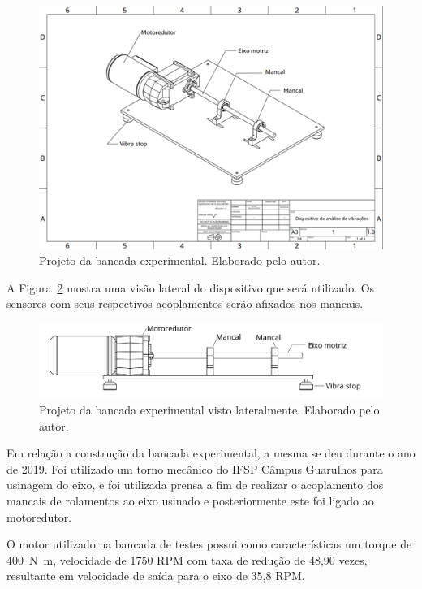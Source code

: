 \documentclass[
	12pt,				
	oneside,			
	a4paper,			
	english,			
	brazil,			
	]{abntex2ppgsi}
\begin{document}
\begin{figure}[H]
\centering
\includegraphics[width=\textwidth,height=\textheight,keepaspectratio]{Figura22}
\caption {Projeto da bancada experimental. Elaborado pelo autor.}
\label{Figura22}
\end{figure}

A Figura~\ref{dispositivo_teste_visto_de_lado} mostra uma visão lateral do dispositivo que será utilizado. Os sensores com seus respectivos acoplamentos serão afixados nos mancais. 

\begin{figure}[H]
\centering
\includegraphics[width=\textwidth,height=\textheight,keepaspectratio]{dispositivo_teste_visto_de_lado}
\caption {Projeto da bancada experimental visto lateralmente. Elaborado pelo autor.}
\label{dispositivo_teste_visto_de_lado}
\end{figure}


Em relação a construção da bancada experimental, a mesma se deu durante o ano de 2019. Foi utilizado um torno mecânico do IFSP Câmpus Guarulhos para usinagem do eixo, e foi utilizada prensa a fim de realizar o acoplamento dos mancais de rolamentos ao eixo usinado e posteriormente este foi ligado ao motoredutor. 

O motor utilizado na bancada de testes possui como características um torque de \SI{400}{\newton\metre}, velocidade de 1750 RPM com taxa de redução de 48,90 vezes, resultante em velocidade de saída para o eixo de 35,8 RPM.  
\end{document}

